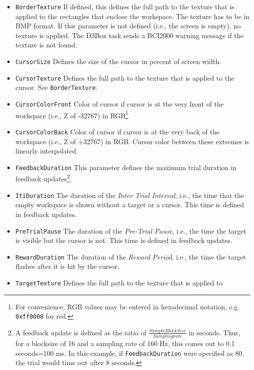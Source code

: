\documentclass[letterpaper,oneside,12pt]{article}
\begin{document}
\begin{itemize}
  \item {\tt BorderTexture} If defined, this defines the full path to the 
        texture that is applied to the rectangles that enclose the workspace.
        The texture has to be in BMP format.
        If this parameter is not defined (i.e., the screen is empty), no
        texture is applied. The D3Box task sends a BCI2000 warning message if
        the texture is not found.
  \item {\tt CursorSize} Defines the size of the cursor in percent of screen width.
  \item {\tt CursorTexture} Defines the full path to the texture that is applied
        to the cursor. See {\tt BorderTexture}.
  \item {\tt CursorColorFront} Color of cursor if cursor is at the very front
        of the workspace (i.e., Z of -32767) in RGB\footnote{For convenience, 
        RGB values may be entered in hexadecimal notation, e.g. 
        \texttt{0xff0000} for red.}
  \item {\tt CursorColorBack} Color of cursor if cursor is at the very back
        of the workspace (i.e., Z of +32767) in RGB. Cursor color between these
        extremes is linearly interpolated.
  \item {\tt FeedbackDuration} This parameter defines the maximum trial duration
        in feedback updates\footnote{A feedback update is defined as the ratio
        of $\frac{SampleBlockSize}{Samplingrate}$ in seconds. Thus, for a blocksize
        of 16 and a sampling rate of 160 Hz, this comes out to 0.1 seconds=100 ms.
        In this example, if {\tt FeedbackDuration} were specified as 80, the trial
        would time out after 8 seconds.}.
  \item {\tt ItiDuration} The duration of the \emph{Inter Trial Interval}, i.e.,
        the time that the empty workspace is shown without a target or a cursor.
        This time is defined in feedback updates.
  \item {\tt PreTrialPause} The duration of the \emph{Pre-Trial Pause}, i.e.,
        the time the target is visible but the cursor is not.
        This time is defined in feedback updates.
  \item {\tt RewardDuration} The duration of the \emph{Reward Period}, i.e.,
        the time the target flashes after it is hit by the cursor.
  \item {\tt TargetTexture} Defines the full path to the texture that is applied to 

\end{itemize}
\end{document}
